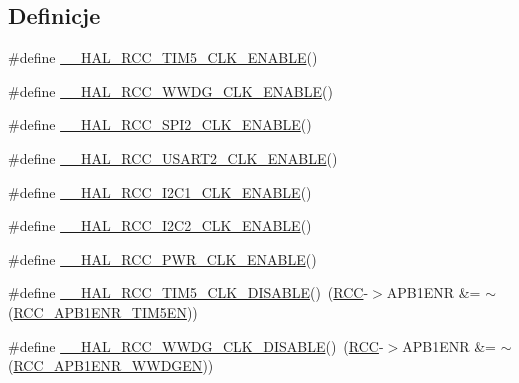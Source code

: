 \subsection*{Definicje}
\begin{DoxyCompactItemize}
\item 
\#define \hyperlink{group___r_c_c___a_p_b1___clock___enable___disable_gab6669f7a9f892e39fb22b349c1afd78d}{\+\_\+\+\_\+\+H\+A\+L\+\_\+\+R\+C\+C\+\_\+\+T\+I\+M5\+\_\+\+C\+L\+K\+\_\+\+E\+N\+A\+B\+LE}()
\item 
\#define \hyperlink{group___r_c_c___a_p_b1___clock___enable___disable_gab0c13cc10b36c32d750be226d2fda3b2}{\+\_\+\+\_\+\+H\+A\+L\+\_\+\+R\+C\+C\+\_\+\+W\+W\+D\+G\+\_\+\+C\+L\+K\+\_\+\+E\+N\+A\+B\+LE}()
\item 
\#define \hyperlink{group___r_c_c___a_p_b1___clock___enable___disable_ga12352adbb876f2b827d6ac3a04d94e26}{\+\_\+\+\_\+\+H\+A\+L\+\_\+\+R\+C\+C\+\_\+\+S\+P\+I2\+\_\+\+C\+L\+K\+\_\+\+E\+N\+A\+B\+LE}()
\item 
\#define \hyperlink{group___r_c_c___a_p_b1___clock___enable___disable_gaaf50c7d2265d978fab8fbb68a518096d}{\+\_\+\+\_\+\+H\+A\+L\+\_\+\+R\+C\+C\+\_\+\+U\+S\+A\+R\+T2\+\_\+\+C\+L\+K\+\_\+\+E\+N\+A\+B\+LE}()
\item 
\#define \hyperlink{group___r_c_c___a_p_b1___clock___enable___disable_gaaeae5b9e93721dd4e34274600996baeb}{\+\_\+\+\_\+\+H\+A\+L\+\_\+\+R\+C\+C\+\_\+\+I2\+C1\+\_\+\+C\+L\+K\+\_\+\+E\+N\+A\+B\+LE}()
\item 
\#define \hyperlink{group___r_c_c___a_p_b1___clock___enable___disable_ga7826848ae938c7f59984d12bc883a6f0}{\+\_\+\+\_\+\+H\+A\+L\+\_\+\+R\+C\+C\+\_\+\+I2\+C2\+\_\+\+C\+L\+K\+\_\+\+E\+N\+A\+B\+LE}()
\item 
\#define \hyperlink{group___r_c_c___a_p_b1___clock___enable___disable_ga6c7399cc977622172aeda52a86ceed92}{\+\_\+\+\_\+\+H\+A\+L\+\_\+\+R\+C\+C\+\_\+\+P\+W\+R\+\_\+\+C\+L\+K\+\_\+\+E\+N\+A\+B\+LE}()
\item 
\#define \hyperlink{group___r_c_c___a_p_b1___clock___enable___disable_ga44f246a1407fadc350e416e4c3256f6e}{\+\_\+\+\_\+\+H\+A\+L\+\_\+\+R\+C\+C\+\_\+\+T\+I\+M5\+\_\+\+C\+L\+K\+\_\+\+D\+I\+S\+A\+B\+LE}()~(\hyperlink{group___peripheral__declaration_ga74944438a086975793d26ae48d5882d4}{R\+CC}-\/$>$A\+P\+B1\+E\+NR \&= $\sim$(\hyperlink{group___peripheral___registers___bits___definition_ga49abbbc8fd297c544df2d337b28f80e4}{R\+C\+C\+\_\+\+A\+P\+B1\+E\+N\+R\+\_\+\+T\+I\+M5\+EN}))
\item 
\#define \hyperlink{group___r_c_c___a_p_b1___clock___enable___disable_ga6afa0a633cf2553743a494d97aa5b997}{\+\_\+\+\_\+\+H\+A\+L\+\_\+\+R\+C\+C\+\_\+\+W\+W\+D\+G\+\_\+\+C\+L\+K\+\_\+\+D\+I\+S\+A\+B\+LE}()~(\hyperlink{group___peripheral__declaration_ga74944438a086975793d26ae48d5882d4}{R\+CC}-\/$>$A\+P\+B1\+E\+NR \&= $\sim$(\hyperlink{group___peripheral___registers___bits___definition_gaf712b922ee776a972d2efa3da0ea4733}{R\+C\+C\+\_\+\+A\+P\+B1\+E\+N\+R\+\_\+\+W\+W\+D\+G\+EN}))

\end{DoxyCompactItemize}
